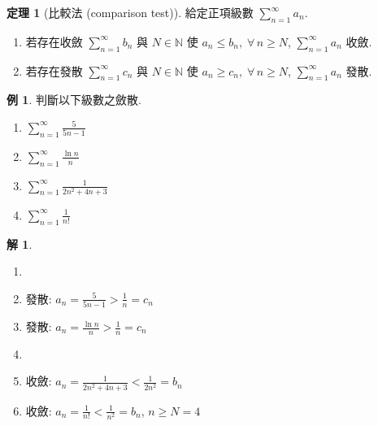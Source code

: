 \documentclass[12pt]{extarticle}
\newcommand{\ds}{\displaystyle}
\theoremstyle{definition}
\newtheorem*{thm}{定理}
\newtheorem*{ex}{例}
\newtheorem*{sol}{解}
\begin{document}
\begin{thm}[比較法 (comparison test)]
  給定正項級數 $\ds\sum_{n = 1}^\infty a_n$. 
  \begin{enumerate}\setlength{\itemsep}{0pt}
    \item 若存在收斂 $\ds\sum_{n = 1}^\infty b_n$ 與 $N\in\mathbb{N}$ 使 $\ds a_n\leqslant b_n,\;\forall\,n\geqslant N$, $\ds\sum_{n = 1}^\infty a_n$ 收斂. 
    \item 若存在發散 $\ds\sum_{n = 1}^\infty c_n$ 與 $N\in\mathbb{N}$ 使 $\ds a_n\geqslant c_n,\;\forall\,n\geqslant N$, $\ds\sum_{n = 1}^\infty a_n$ 發散. 
  \end{enumerate}
\end{thm}

\begin{ex} 判斷以下級數之斂散. 
  \begin{multicols}{4}
    \begin{enumerate}\setlength{\itemsep}{0pt}
      \item $\ds\sum_{n = 1}^\infty\frac{5}{5 n - 1}$
      \item $\ds\sum_{n = 1}^\infty\frac{\ln n}{n}$
      \item $\ds\sum_{n = 1}^\infty\frac{1}{2n^2 + 4n + 3}$
      \item $\ds\sum_{n = 1}^\infty\frac{1}{n!}$
    \end{enumerate}
  \end{multicols}
\end{ex}

\begin{sol}
  \begin{multicols}{2}
    \begin{enumerate}\setlength{\itemsep}{0pt}
      \item[]
      \item 發散: $\ds a_n = \frac{5}{5 n - 1} > \frac{1}{n} = c_n$
      \item 發散: $\ds a_n = \frac{\ln n}{n} > \frac{1}{n} = c_n$
      \item[]
      \item 收斂: $\ds a_n = \frac{1}{2n^2 + 4n + 3} < \frac{1}{2n^2} = b_n$
      \item 收斂: $\ds a_n = \frac{1}{n!} < \frac{1}{n^2} = b_n$, $n\geqslant N = 4$
    \end{enumerate}
  \end{multicols}
\end{sol}
\end{document}

